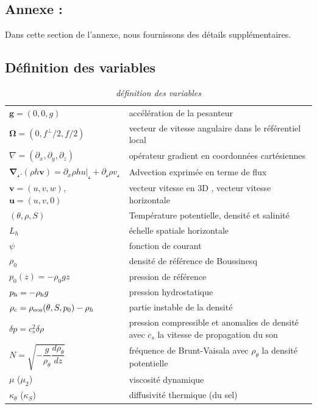 \documentclass{rapportECC}
\begin{document}
\newpage
\begin{appendices}
\section{Annexe : }
Dans cette section de l'annexe, nous fournissons des détails supplémentaires.
\subsection{Définition des variables}
{\renewcommand{\arraystretch}{1.5}
\begin{table}
\begin{center}
\begin{tabular}{ l l }
\hline 
$\mathbf{g} = (0,0,g)$ &  accélération de la pesanteur \\
$\boldsymbol{\Omega} = (0,f^\perp/2,f/2)$ & vecteur de vitesse angulaire dans le référentiel local \\
$\nabla = (\partial_x, \partial_y, \partial_z)$ & opérateur gradient en coordonnées cartésiennes\\
$\mathbf{\nabla}_{\mathscr{s}}.(\rho h \mathbf{v})= \partial_{x} \rho h u \big\vert_\mathscr{s}+\partial_\mathscr{s}\rho v_\mathscr{s}$ & Advection exprimée en terme de flux  \\
\hline
$\mathbf{v} = (u,v,w)$, $\mathbf{u} = (u,v,0)$  & vecteur vitesse en 3D , vecteur vitesse horizontale  \\ 
$(\theta,\rho,S)$ & Température potentielle, densité et salinité \\
$L_h$ & échelle spatiale horizontale \\
$\psi$ & fonction de courant \\
$\rho_0$  &  densité de référence de Boussinesq \\
$p_0(z) = - \rho_0 g z$ & pression de référence   \\
$p_{\rm h}=-\rho_{\rm h} g$  & pression hydrostatique\\
$\rho_{\rm c} = \rho_{\rm eos}(\theta,S,p_0)-\rho_h$  & partie instable de la densité \\
$\delta p=c_s^2\delta\rho$  & pression compressible et anomalies de densité avec $c_s$ la vitesse de propagation du son \\
$N = \sqrt{-\dfrac{g}{\rho_{\theta}}\dfrac{d\rho_{\theta}}{dz}}$ & fréquence de Brunt-Vaisala avec $\rho_{\theta}$ la densité potentielle \\
\hline
$\mu$ ($\mu_2$)  & viscosité dynamique \\
$\kappa_\theta$ ($\kappa_S$) & diffusivité thermique (du sel)\\
\hline 
\end{tabular}
\end{center}
\caption{\textit{définition des variables}}
\label{Table_notations}
\end{table}
}


\end{appendices}
\end{document}
